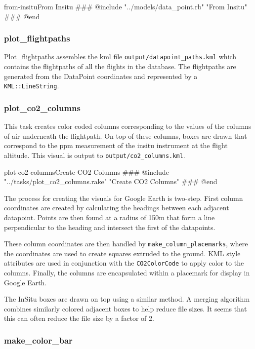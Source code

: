 \documentclass[12pt]{article}
\begin{document}
\begin{code}{from-insitu}{From Insitu}
### @include "../models/data_point.rb" "From Insitu"
### @end
\end{code}

\subsubsection*{plot\_flightpaths}

Plot\_flightpaths assembles the kml file \texttt{output/datapoint\_paths.kml} which contains the flightpaths of all the flights in the database.  The flightpaths are generated from the DataPoint coordinates and represented by a \texttt{KML::LineString}.

\subsubsection*{plot\_co2\_columns}

This task creates color coded columns corresponding to the values of the columns of air underneath the flightpath.  On top of these columns, boxes are drawn that correspond to the ppm measurement of the insitu instrument at the flight altitude.  This visual is output to \texttt{output/co2\_columns.kml}.

\begin{code}{plot-co2-columns}{Create CO2 Columns}
### @include "../tasks/plot_co2_columns.rake" "Create CO2 Columns"
### @end
\end{code}

The process for creating the visuals for Google Earth is two-step.  First column coordinates are created by calculating the headings between each adjacent datapoint.  Points are then found at a radius of 150m that form a line perpendicular to the heading and intersect the first of the datapoints.

These column coordinates are then handled by \texttt{make\_column\_placemarks}, where the coordinates are used to create squares extruded to the ground.  KML style attributes are used in conjunction with the \texttt{CO2ColorCode} to apply color to the columns. Finally, the columns are encapsulated within a placemark for display in Google Earth.  

The InSitu boxes are drawn on top using a similar method.  A merging algorithm combines similarly colored adjacent boxes to help reduce file sizes.  It seems that this can often reduce the file size by a factor of 2.

\subsubsection*{make\_color\_bar}
\end{document}
